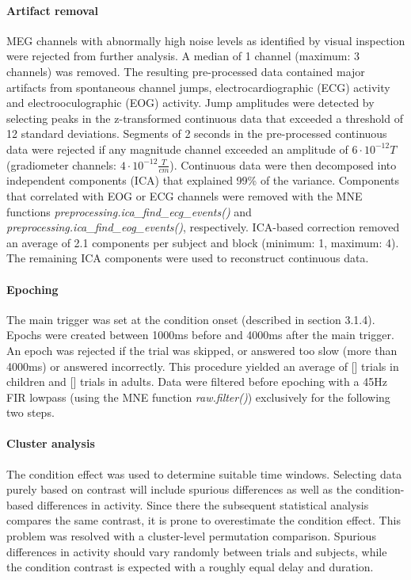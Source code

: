 \paragraph{Artifact removal}
MEG channels with abnormally high noise levels as identified by visual inspection were rejected from further analysis. A median of 1 channel (maximum: 3 channels) was removed.
The resulting pre-processed data contained major artifacts from spontaneous channel jumps, electrocardiographic (ECG) activity and electrooculographic (EOG) activity.
Jump amplitudes were detected by selecting peaks in the z-transformed continuous data that exceeded a threshold of 12 standard deviations.
Segments of 2 seconds in the pre-processed continuous data were rejected if any magnitude channel exceeded an amplitude of $6\cdot10^{-12}T$ (gradiometer channels: $4\cdot10^{-12}\frac{T}{cm}$).
Continuous data were then decomposed into independent components (ICA) that explained 99\% of the variance.
Components that correlated with EOG or ECG channels were removed with the MNE functions \emph{preprocessing.ica\_find\_ecg\_events()} and \emph{preprocessing.ica\_find\_eog\_events()}, respectively.
ICA-based correction removed an average of 2.1 components per subject and block (minimum: 1, maximum: 4).
The remaining ICA components were used to reconstruct continuous data.

\paragraph{Epoching}
The main trigger was set at the condition onset (described in section 3.1.4).
Epochs were created between 1000ms before and 4000ms after the main trigger.
An epoch was rejected if the trial was skipped, or answered too slow (more than 4000ms) or answered incorrectly.
This procedure yielded an average of [] trials in children and [] trials in adults.
Data were filtered before epoching with a 45Hz FIR lowpass (using the MNE function \emph{raw.filter()}) exclusively for the following two steps.

\paragraph{Cluster analysis}
The condition effect was used to determine suitable time windows.
Selecting data purely based on contrast will include spurious differences as well as the condition-based differences in activity.
Since there the subsequent statistical analysis compares the same contrast, it is prone to overestimate the condition effect.
This problem was resolved with a cluster-level permutation comparison.
Spurious differences in activity should vary randomly between trials and subjects, while the condition contrast is expected with a roughly equal delay and duration.

